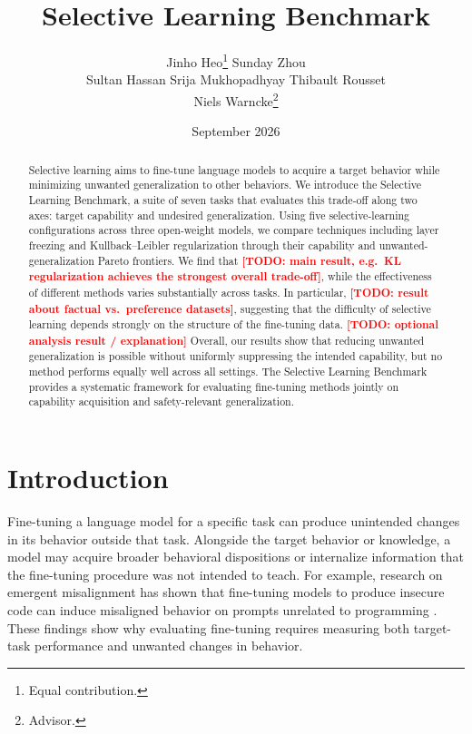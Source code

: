 \documentclass[11pt]{article}
\title{Selective Learning Benchmark}
\author{
  Jinho Heo\thanks{Equal contribution.}\quad
  Sunday Zhou\footnotemark[1] \\[4pt]
  Sultan Hassan \quad Srija Mukhopadhyay \quad Thibault Rousset \\[4pt]
  Niels Warncke\thanks{Advisor.}
}
\date{September 2026}
\newcommand{\todo}[1]{\textcolor{red}{\textbf{[TODO: #1]}}}
\renewcommand{\thefootnote}{\fnsymbol{footnote}}
\begin{document}
\maketitle
\renewcommand{\thefootnote}{\arabic{footnote}}
\setcounter{footnote}{0}

\begin{abstract}
Selective learning aims to fine-tune language models to acquire a target behavior while
minimizing unwanted generalization to other behaviors. We introduce the Selective Learning
Benchmark, a suite of seven tasks that evaluates this trade-off along two axes: target
capability and undesired generalization. Using five selective-learning configurations across
three open-weight models, we compare techniques including layer freezing and
Kullback--Leibler regularization through their capability and unwanted-generalization Pareto
frontiers. We find that \todo{main result, e.g.\ KL regularization achieves the strongest
overall trade-off}, while the effectiveness of different methods varies substantially across
tasks. In particular, \todo{result about factual vs.\ preference datasets}, suggesting that
the difficulty of selective learning depends strongly on the structure of the fine-tuning
data. \todo{optional analysis result / explanation} Overall, our results show that reducing
unwanted generalization is possible without uniformly suppressing the intended capability,
but no method performs equally well across all settings. The Selective Learning Benchmark
provides a systematic framework for evaluating fine-tuning methods jointly on capability
acquisition and safety-relevant generalization.
\end{abstract}

\section{Introduction}

Fine-tuning a language model for a specific task can produce unintended changes in its
behavior outside that task. Alongside the target behavior or knowledge, a model may acquire
broader behavioral dispositions or internalize information that the fine-tuning procedure was
not intended to teach. For example, research on emergent misalignment has shown that
fine-tuning models to produce insecure code can induce misaligned behavior on prompts
unrelated to programming \citep{betley2025emergent}. These findings show why evaluating
fine-tuning requires measuring both target-task performance and unwanted changes in behavior.
\end{document}
